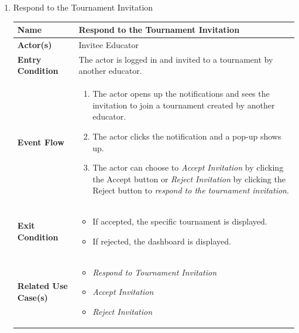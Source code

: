 \begin{enumerate}
\item Respond to the Tournament Invitation
\begin{center}
    \begin{tabular}{ | m{10em} | m{10cm}| } 
      \hline
      \textbf{Name} & Respond to the Tournament Invitation  \\ 
      \hline
      \textbf{Actor(s)} & Invitee Educator \\ 
      \hline
      \textbf{Entry Condition} & The actor is logged in and invited to a tournament by another educator.  \\ 
      \hline
      \textbf{Event Flow} & 
          \begin{enumerate}[(1)]
              \item The actor opens up the notifications and sees the invitation to join a tournament created by another educator.
              \item The actor clicks the notification and a pop-up shows up.
              \item The actor can choose to \textit{Accept Invitation} by clicking the Accept button or \textit{Reject Invitation} by clicking the Reject button to \textit{respond to the tournament invitation}.
          \end{enumerate}
      \\ 
      \hline
      \textbf{Exit Condition} & 
      \begin{itemize}
          \item If accepted, the specific tournament is displayed.
          \item If rejected, the dashboard is displayed.
      \end{itemize}\\ 
      \hline
      \textbf{Related Use Case(s)} & 
      \begin{itemize}
          \item \textit{Respond to Tournament Invitation}
          \item \textit{Accept Invitation}
          \item \textit{Reject Invitation}
      \end{itemize}
          \\ 
      \hline
    \end{tabular}
\end{center}


\newpage



\end{enumerate}
